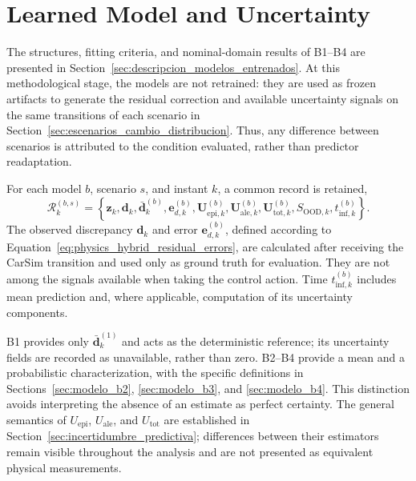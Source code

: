 \documentclass[12pt,a4paper]{report}
\begin{document}
\section{Learned Model and Uncertainty}
\label{sec:modelo_aprendido_incertidumbre_metodologia}

The structures, fitting criteria, and nominal-domain results of B1--B4 are presented in Section~\ref{sec:descripcion_modelos_entrenados}. At this methodological stage, the models are not retrained: they are used as frozen artifacts to generate the residual correction and available uncertainty signals on the same transitions of each scenario in Section~\ref{sec:escenarios_cambio_distribucion}. Thus, any difference between scenarios is attributed to the condition evaluated, rather than predictor readaptation.

For each model $b$, scenario $s$, and instant $k$, a common record is retained,
\begin{equation}
    \mathcal{R}^{(b,s)}_k
    =
    \left\{
        \mathbf z_k,
        \mathbf d_k,
        \bar{\mathbf d}^{(b)}_k,
        \mathbf e^{(b)}_{d,k},
        \mathbf U^{(b)}_{\mathrm{epi},k},
        \mathbf U^{(b)}_{\mathrm{ale},k},
        \mathbf U^{(b)}_{\mathrm{tot},k},
        S_{\mathrm{OOD},k},
        t^{(b)}_{\mathrm{inf},k}
    \right\}.
    \label{eq:common_uncertainty_record}
\end{equation}
The observed discrepancy $\mathbf d_k$ and error $\mathbf e^{(b)}_{d,k}$, defined according to Equation~\eqref{eq:physics_hybrid_residual_errors}, are calculated after receiving the CarSim transition and used only as ground truth for evaluation. They are not among the signals available when taking the control action. Time $t^{(b)}_{\mathrm{inf},k}$ includes mean prediction and, where applicable, computation of its uncertainty components.

B1 provides only $\bar{\mathbf d}^{(1)}_k$ and acts as the deterministic reference; its uncertainty fields are recorded as unavailable, rather than zero. B2--B4 provide a mean and a probabilistic characterization, with the specific definitions in Sections~\ref{sec:modelo_b2}, \ref{sec:modelo_b3}, and \ref{sec:modelo_b4}. This distinction avoids interpreting the absence of an estimate as perfect certainty. The general semantics of $U_{\mathrm{epi}}$, $U_{\mathrm{ale}}$, and $U_{\mathrm{tot}}$ are established in Section~\ref{sec:incertidumbre_predictiva}; differences between their estimators remain visible throughout the analysis and are not presented as equivalent physical measurements.
\end{document}
